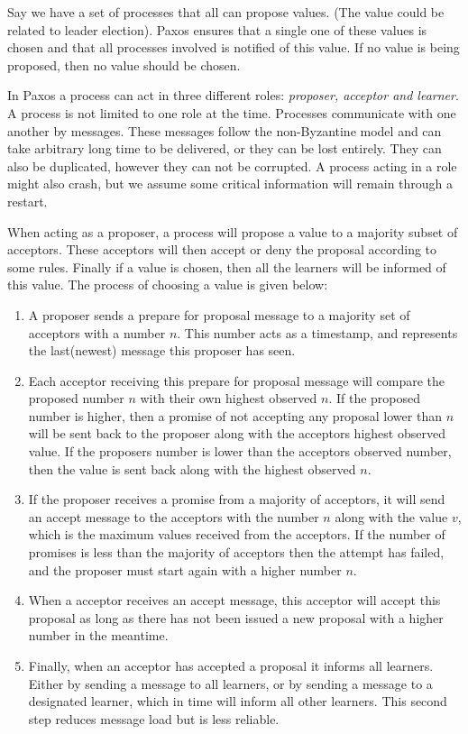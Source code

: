Say we have a set of processes that all can propose values. (The value could be related to leader election). Paxos ensures that a single one of these values is chosen and that all processes involved is notified of this value. If no value is being proposed, then no value should be chosen. 

In Paxos a process can act in three different roles: {\it proposer, acceptor and learner}. A process is not limited to one role at the time. Processes communicate with one another by messages. These messages follow the non-Byzantine model and can take arbitrary long time to be delivered, or they can be lost entirely. They can also be duplicated, however they can not be corrupted. A process acting in a role might also crash, but we assume some critical information will remain through a restart. 

When acting as a proposer, a process will propose a value to a majority subset of acceptors. These acceptors will then accept or deny the proposal according to some rules. Finally if a value is chosen, then all the learners will be informed of this value. The process of choosing a value is given below:

\begin{enumerate}

\item A proposer sends a prepare for proposal message to a majority set of acceptors with a number $n$. This number acts as a timestamp, and represents the last(newest) message this proposer has seen. 
\item Each acceptor receiving this prepare for proposal message will compare the proposed number $n$ with their own highest observed $n$. If the proposed number is higher, then a promise of not accepting any proposal lower than $n$ will be sent back to the proposer along with the acceptors highest observed value. If the proposers number is lower than the acceptors observed number, then the value is sent back along with the highest observed $n$.
\item If the proposer receives a promise from a majority of acceptors, it will send an accept message to the acceptors with the number $n$ along with the value $v$, which is the maximum values received from the acceptors. If the number of promises is less than the majority of acceptors then the attempt has failed, and the proposer must start again with a higher number $n$.
\item When a acceptor receives an accept message, this acceptor will accept this proposal as long as there has not been issued a new proposal with a higher number in the meantime. 
\item Finally, when an acceptor has accepted a proposal it informs all learners. Either by sending a message to all learners, or by sending a message to a designated learner, which in time will inform all other learners. This second step reduces message load but is less reliable.

\end{enumerate}


